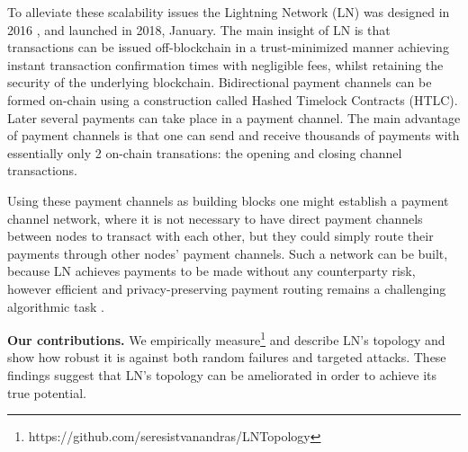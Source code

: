 \documentclass[runningheads]{llncs}
\begin{document}
To alleviate these scalability issues the Lightning Network (LN) was designed in 2016 \cite{poon2016bitcoin}, and launched in 2018, January. The main insight of LN is that transactions can be issued off-blockchain in a trust-minimized manner achieving instant transaction confirmation times with negligible fees, whilst retaining the security of the underlying blockchain. Bidirectional payment channels can be formed on-chain using a construction called Hashed Timelock Contracts (HTLC). Later several payments can take place in a payment channel. The main advantage of payment channels is that one can send and receive thousands of payments with essentially only 2 on-chain transations: the opening and closing channel transactions. 

Using these payment channels as building blocks one might establish a payment channel network, where it is not necessary to have direct payment channels between nodes to transact with each other, but they could simply route their payments through other nodes' payment channels.
Such a network can be built, because LN achieves payments to be made without any counterparty risk, however efficient and privacy-preserving payment routing remains a challenging algorithmic task \cite{roos2017settling}. 

\textbf{Our contributions.} We empirically measure\footnote{https://github.com/seresistvanandras/LNTopology} and describe LN's topology and show how robust it is against both random failures and targeted attacks. These findings suggest that LN's topology can be ameliorated in order to achieve its true potential.
\end{document}
